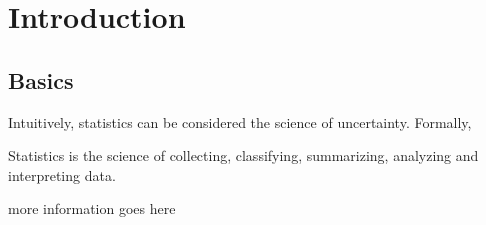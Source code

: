 \chapter{Introduction}
\label{sec.matrix}
\pagestyle{myheadings}  

\section{Basics}


Intuitively, statistics can be considered the science of uncertainty. Formally,


\begin{definition}[Statistics]	
Statistics is the science of collecting, classifying, summarizing, analyzing and interpreting data.
\end{definition}

more information goes here